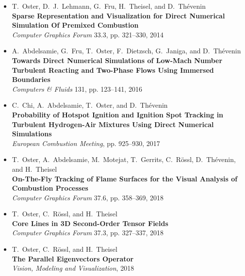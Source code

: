 %
\begin{itemize}[label={},leftmargin=0pt]
    \item T.~Oster, D.~J.~Lehmann, G.~Fru, H.~Theisel, and D.~Th\'evenin\\
        \textbf{Sparse Representation and Visualization for Direct Numerical
        Simulation Of Premixed Combustion}\\
        {\emph{Computer Graphics Forum} 33.3, pp. 321--330, 2014}

    \item A.~Abdelsamie, G.~Fru, T.~Oster, F.~Dietzsch, G.~Janiga,
        and D.~Thévenin\\
        \textbf{Towards Direct Numerical Simulations of Low-Mach Number
        Turbulent Reacting and Two-Phase Flows Using Immersed Boundaries}\\
        {\emph{Computers \& Fluids} 131, pp. 123--141, 2016}

    \item C.~Chi, A.~Abdelsamie, T.~Oster, and D.~Thévenin\\
        \textbf{Probability of Hotspot Ignition and Ignition Spot Tracking in
        Turbulent Hydrogen-Air Mixtures Using Direct Numerical Simulations}\\
        {\emph{ European Combustion Meeting}, pp. 925--930, 2017}

    \item T.~Oster, A.~Abdelsamie, M.~Motejat, T.~Gerrits, C.~R\"ossl,
        D.~Thévenin, and H.~Theisel\\
        \textbf{On-The-Fly Tracking of Flame Surfaces for the Visual Analysis
        of Combustion Processes}\\
        {\emph{Computer Graphics Forum} 37.6, pp. 358--369, 2018}

    \item T.~Oster, C.~R\"ossl, and H.~Theisel\\
        \textbf{Core Lines in \ac{3D} Second-Order Tensor Fields}\\
        {\emph{Computer Graphics Forum} 37.3, pp. 327--337, 2018}

    \item T.~Oster, C.~R\"ossl, and H.~Theisel\\
        \textbf{The Parallel Eigenvectors Operator}\\
        {\emph{Vision, Modeling and Visualization}, 2018}
\end{itemize}
\clearpage
%

